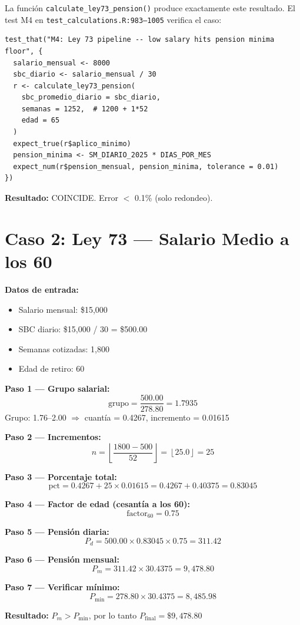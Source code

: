 \documentclass[11pt,a4paper]{report}
\begin{document}
\begin{tcolorbox}[colback=orange!5!white, colframe=orange!75!black, title=\textbf{Aplicaci\'on en C\'odigo: Verificaci\'on}]
La funci\'on \texttt{calculate\_ley73\_pension()} produce exactamente este resultado. El test M4 en \texttt{test\_calculations.R:983--1005} verifica el caso:

\begin{lstlisting}
test_that("M4: Ley 73 pipeline -- low salary hits pension minima floor", {
  salario_mensual <- 8000
  sbc_diario <- salario_mensual / 30
  r <- calculate_ley73_pension(
    sbc_promedio_diario = sbc_diario,
    semanas = 1252,  # 1200 + 1*52
    edad = 65
  )
  expect_true(r$aplico_minimo)
  pension_minima <- SM_DIARIO_2025 * DIAS_POR_MES
  expect_num(r$pension_mensual, pension_minima, tolerance = 0.01)
})
\end{lstlisting}

\textbf{Resultado:} COINCIDE. Error $<$ 0.1\% (solo redondeo).
\end{tcolorbox}


\section{Caso 2: Ley 73 --- Salario Medio a los 60}

\begin{tcolorbox}[colback=blue!5!white, colframe=blue!75!black, title=\textbf{Definici\'on Formal: Traza Num\'erica Completa}, breakable]
\textbf{Datos de entrada:}
\begin{itemize}
  \item Salario mensual: \$15,000
  \item SBC diario: \$15,000 / 30 = \$500.00
  \item Semanas cotizadas: 1,800
  \item Edad de retiro: 60
\end{itemize}

\textbf{Paso 1 --- Grupo salarial:}
\[
  \text{grupo} = \frac{500.00}{278.80} = 1.7935
\]
Grupo: 1.76--2.00 $\Rightarrow$ cuant\'ia = 0.4267, incremento = 0.01615

\textbf{Paso 2 --- Incrementos:}
\[
  n = \left\lfloor \frac{1800 - 500}{52} \right\rfloor = \left\lfloor 25.0 \right\rfloor = 25
\]

\textbf{Paso 3 --- Porcentaje total:}
\[
  \text{pct} = 0.4267 + 25 \times 0.01615 = 0.4267 + 0.40375 = 0.83045
\]

\textbf{Paso 4 --- Factor de edad (cesant\'ia a los 60):}
\[
  \text{factor}_{60} = 0.75
\]

\textbf{Paso 5 --- Pensi\'on diaria:}
\[
  P_d = 500.00 \times 0.83045 \times 0.75 = 311.42
\]

\textbf{Paso 6 --- Pensi\'on mensual:}
\[
  P_m = 311.42 \times 30.4375 = 9,478.80
\]

\textbf{Paso 7 --- Verificar m\'inimo:}
\[
  P_{\min} = 278.80 \times 30.4375 = 8,485.98
\]

\textbf{Resultado:} $P_m > P_{\min}$, por lo tanto $P_{\text{final}} = \$9,478.80$
\end{tcolorbox}
\end{document}
